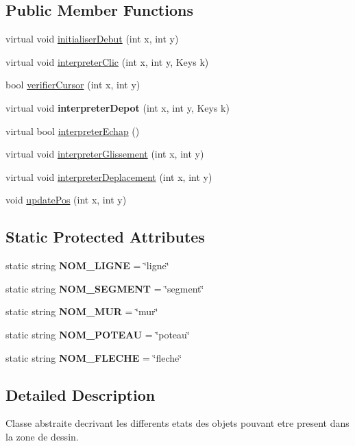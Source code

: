 \subsection*{Public Member Functions}
\begin{DoxyCompactItemize}
\item 
virtual void \hyperlink{group__inf2990_ga1e28e8b6a0c43384138f39e937061013}{initialiser\+Debut} (int x, int y)
\item 
virtual void \hyperlink{group__inf2990_gae1cbaf5203e0844d9d565b5b63c7eea0}{interpreter\+Clic} (int x, int y, Keys k)
\item 
bool \hyperlink{group__inf2990_gadfd0e2bca77bd16596ff4d1545e834cc}{verifier\+Cursor} (int x, int y)
\item 
virtual void {\bfseries interpreter\+Depot} (int x, int y, Keys k)
\item 
virtual bool \hyperlink{group__inf2990_gaf4315e7507c9a54e90d76279169b7c5c}{interpreter\+Echap} ()
\item 
virtual void \hyperlink{group__inf2990_gab480f0834ca49119adc0c3fd92723348}{interpreter\+Glissement} (int x, int y)
\item 
virtual void \hyperlink{group__inf2990_gaf10b0c6cd858373e7ecc8a8a66a50320}{interpreter\+Deplacement} (int x, int y)
\item 
void \hyperlink{group__inf2990_gabcc47ac07b57fc7f58737ba9b88bcfa2}{update\+Pos} (int x, int y)
\end{DoxyCompactItemize}
\subsection*{Static Protected Attributes}
\begin{DoxyCompactItemize}
\item 
static string {\bfseries N\+O\+M\+\_\+\+L\+I\+G\+NE} = \char`\"{}ligne\char`\"{}
\item 
static string {\bfseries N\+O\+M\+\_\+\+S\+E\+G\+M\+E\+NT} = \char`\"{}segment\char`\"{}
\item 
static string {\bfseries N\+O\+M\+\_\+\+M\+UR} = \char`\"{}mur\char`\"{}
\item 
static string {\bfseries N\+O\+M\+\_\+\+P\+O\+T\+E\+AU} = \char`\"{}poteau\char`\"{}
\item 
static string {\bfseries N\+O\+M\+\_\+\+F\+L\+E\+C\+HE} = \char`\"{}fleche\char`\"{}
\end{DoxyCompactItemize}


\subsection{Detailed Description}
Classe abstraite decrivant les differents etats des objets pouvant etre present dans la zone de dessin. 

